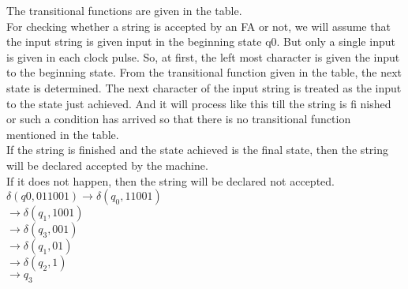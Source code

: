 \documentclass[8pt]{beamer}
\begin{document}
\begin{frame}
\hspace*{0.5cm} The transitional functions are given in the table.\\
\hspace*{0.5cm} For checking whether a string is accepted by an FA or not, we will assume that the input string is
given input in the beginning state q0. But only a single input is given in each clock pulse. So, at first,
the left most character is given the input to the beginning state. From the transitional function given in
the table, the next state is determined. The next character of the input string is treated as the input to the
state just achieved. And it will process like this till the string is fi nished or such a condition has arrived
so that there is no transitional function mentioned in the table.\\
\hspace*{0.5cm} If the string is finished and the state achieved is the final state, then the string will be declared
accepted by the machine.\\
\hspace*{0.5cm} If it does not happen, then the string will be declared not accepted.\\
\hspace*{3.4cm} $\delta(q0, 011001) \rightarrow \delta(q_{0}, 11001)$ \\
\hspace*{5cm} $\rightarrow \delta(q_{1}, 1001)$ \\
\hspace*{5cm} $\rightarrow \delta(q_{3}, 001)$ \\
\hspace*{5cm} $\rightarrow \delta(q_{1}, 01)$ \\
\hspace*{5cm} $\rightarrow \delta(q_{2}, 1)$ \\
\hspace*{5cm} $\rightarrow q_{3}$ \\
\end{frame}
\end{document}
